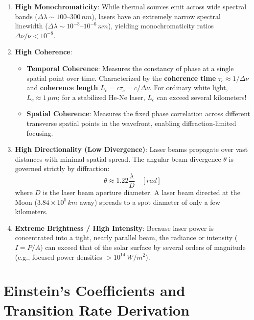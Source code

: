 \begin{enumerate}
    \item \textbf{High Monochromaticity}: While thermal sources emit across wide spectral bands ($\Delta \lambda \sim 100\text{--}300\,\si{nm}$), lasers have an extremely narrow spectral linewidth ($\Delta \lambda \sim 10^{-3}\text{--}10^{-6}\,\si{nm}$), yielding monochromaticity ratios $\Delta \nu / \nu < 10^{-8}$.
    \item \textbf{High Coherence}:
    \begin{itemize}
        \item \textbf{Temporal Coherence}: Measures the constancy of phase at a single spatial point over time. Characterized by the \textbf{coherence time} $\tau_c \approx 1/\Delta \nu$ and \textbf{coherence length} $L_c = c \tau_c = c/\Delta \nu$. For ordinary white light, $L_c \approx 1\,\si{\mu m}$; for a stabilized He-Ne laser, $L_c$ can exceed several kilometers!
        \item \textbf{Spatial Coherence}: Measures the fixed phase correlation across different transverse spatial points in the wavefront, enabling diffraction-limited focusing.
    \end{itemize}
    \item \textbf{High Directionality (Low Divergence)}: Laser beams propagate over vast distances with minimal spatial spread. The angular beam divergence $\theta$ is governed strictly by diffraction:
    \begin{equation}
        \theta \approx 1.22 \frac{\lambda}{D} \quad [\si{rad}]
    \end{equation}
    where $D$ is the laser beam aperture diameter. A laser beam directed at the Moon ($3.84 \times 10^5\,\si{km}$ away) spreads to a spot diameter of only a few kilometers.
    \item \textbf{Extreme Brightness / High Intensity}: Because laser power is concentrated into a tight, nearly parallel beam, the radiance or intensity ($I = P/A$) can exceed that of the solar surface by several orders of magnitude (e.g., focused power densities $> 10^{14}\,\si{W/m^2}$).
\end{enumerate}

\section{Einstein's Coefficients and Transition Rate Derivation}

